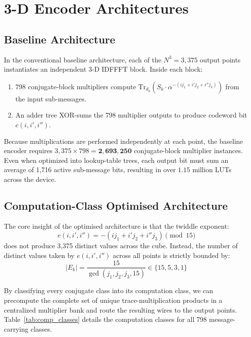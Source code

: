 \documentclass[11pt,a4paper]{article}
\begin{document}
\section{3-D Encoder Architectures}

\subsection{Baseline Architecture}
In the conventional baseline architecture, each of the $N^3 = 3,375$ output points instantiates an independent 3-D IDFFFT block. Inside each block:
\begin{enumerate}
    \item 798 conjugate-block multipliers compute $\mathrm{Tr}_{d_k}(S_k \cdot \alpha^{-(i j_1 + i' j_2 + i'' j_3)})$ from the input sub-messages.
    \item An adder tree XOR-sums the 798 multiplier outputs to produce codeword bit $c(i, i', i'')$.
\end{enumerate}
Because multiplications are performed independently at each point, the baseline encoder requires $3,375 \times 798 = \mathbf{2,693,250}$ conjugate-block multiplier instances. Even when optimized into lookup-table trees, each output bit must sum an average of 1,716 active sub-message bits, resulting in over $1.15$ million LUTs across the device.

\subsection{Computation-Class Optimised Architecture}
The core insight of the optimised architecture is that the twiddle exponent:
\begin{equation}
e(i, i', i'') = -(i j_1 + i' j_2 + i'' j_3) \pmod{15}
\end{equation}
does not produce 3,375 distinct values across the cube. Instead, the number of distinct values taken by $e(i, i', i'')$ across all points is strictly bounded by:
\begin{equation}
|E_k| = \frac{15}{\gcd(j_1, j_2, j_3, 15)} \in \{15, 5, 3, 1\}
\end{equation}

By classifying every conjugate class into its computation class, we can precompute the complete set of unique trace-multiplication products in a centralized multiplier bank and route the resulting wires to the output points. Table~\ref{tab:comp_classes} details the computation classes for all 798 message-carrying classes.
\end{document}
